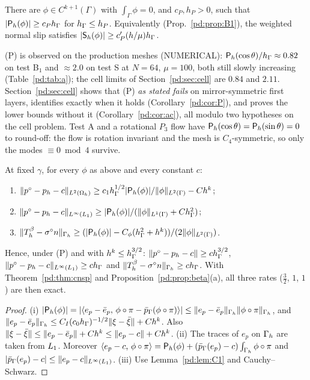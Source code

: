 \begin{assumption}[(P)]\label{pd:ass:P}
There are $\phi\in C^{k+1}(\Gamma)$ with $\int_\Gamma\phi=0$, and $c_P,h_P>0$, such that $|\mathsf P_h(\phi)|\ge c_Ph_\Gamma$ for $h_\Gamma\le h_P$. Equivalently (Prop.~\ref{pd:prop:B1}), the weighted normal slip satisfies $|\mathsf S_h(\phi)|\ge c_P'(h/\mu)h_\Gamma$.
\end{assumption}
(P) is observed on the production meshes (NUMERICAL): $\mathsf P_h(\cos\theta)/h_\Gamma\approx0.82$ on test B$_1$ and $\approx2.0$ on test S at $N=64$, $\mu=100$, both still slowly increasing (Table~\ref{pd:tab:a}); the cell limits of Section~\ref{pd:sec:cell} are $0.84$ and $2.11$. Section~\ref{pd:sec:cell} shows that (P) \emph{as stated fails} on mirror-symmetric first layers, identifies exactly when it holds (Corollary~\ref{pd:cor:P}), and proves the lower bounds without it (Corollary~\ref{pd:cor:ac}), all modulo two hypotheses on the cell problem. Test A and a rotational $P_3$ flow have $\mathsf P_h(\cos\theta)=\mathsf P_h(\sin\theta)=0$ to round-off: the flow is rotation invariant and the mesh is $C_4$-symmetric, so only the modes $\equiv0\bmod4$ survive.

\begin{theorem}\label{pd:thm:P}
At fixed $\gamma$, for every $\phi$ as above and every constant $c$:
\begin{enumerate}[label=(\roman*)]
\item $\lVert p^\circ-p_h-c\rVert_{L^2(\Omega_h)}\ge c_1h_\Gamma^{1/2}|\mathsf P_h(\phi)|/\lVert \phi\rVert_{L^2(\Gamma)}-Ch^k$;
\item $\lVert p^\circ-p_h-c\rVert_{L^\infty(L_1)}\ge|\mathsf P_h(\phi)|/(\lVert \phi\rVert_{L^1(\Gamma)}+Ch_\Gamma^2)$;
\item $\lVert T^\beta_h-\sigma^\circ n\rVert_{\Gamma_h}\ge(|\mathsf P_h(\phi)|-C_\phi(h_\Gamma^2+h^k))/(2\lVert \phi\rVert_{L^2(\Gamma)})$.
\end{enumerate}
Hence, under (P) and with $h^k\le h_\Gamma^{3/2}$: $\lVert p^\circ-p_h-c\rVert\ge ch_\Gamma^{3/2}$, $\lVert p^\circ-p_h-c\rVert_{L^\infty(L_1)}\ge ch_\Gamma$ and $\lVert T^\beta_h-\sigma^\circ n\rVert_{\Gamma_h}\ge ch_\Gamma$. With Theorem~\ref{pd:thm:cnsp} and Proposition~\ref{pd:prop:beta}(a), all three rates ($\frac32$, $1$, $1$) are then exact.
\end{theorem}

\begin{proof}
(i) $|\mathsf P_h(\phi)|=|\langle e_p-\bar e_p,\, \phi\circ\pi-\bar p_{\Gamma}(\phi\circ\pi)\rangle|\le\lVert e_p-\bar e_p\rVert_{\Gamma_h}\lVert \phi\circ\pi\rVert_{\Gamma_h}$, and $\lVert e_p-\bar e_p\rVert_{\Gamma_h}\le C_I(c_0h_\Gamma)^{-1/2}\lVert \xi-\bar\xi\rVert+Ch^k$. Also $\lVert \xi-\bar\xi\rVert\le\lVert e_p-\bar e_p\rVert+Ch^k\le\lVert e_p-c\rVert+Ch^k$. (ii) The traces of $e_p$ on $\Gamma_h$ are taken from $L_1$. Moreover $\langle e_p-c,\, \phi\circ\pi\rangle=\mathsf P_h(\phi)+(\bar p_{\Gamma}(e_p)-c)\int_{\Gamma_h}\phi\circ\pi$ and $|\bar p_{\Gamma}(e_p)-c|\le\lVert e_p-c\rVert_{L^\infty(L_1)}$. (iii) Use Lemma~\ref{pd:lem:C1} and Cauchy--Schwarz.
\end{proof}

